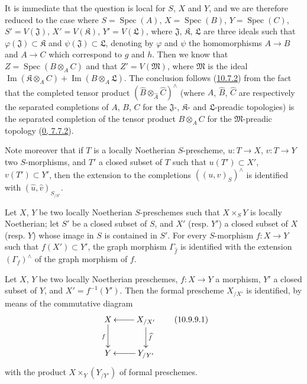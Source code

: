 It is immediate that the question is local for $S$, $X$ and $Y$, and we
are therefore reduced to the case where $S=\operatorname{Spec}(A)$,
$X=\operatorname{Spec}(B)$, $Y=\operatorname{Spec}(C)$,
$S'=V(\mathfrak{J})$, $X'=V(\mathfrak{K})$, $Y'=V(\mathfrak{L})$, where
$\mathfrak{J}$, $\mathfrak{K}$, $\mathfrak{L}$ are three ideals such
that $\varphi(\mathfrak{J})\subset\mathfrak{K}$ and
$\psi(\mathfrak{J})\subset\mathfrak{L}$, denoting by $\varphi$ and
$\psi$ the homomorphisms $A\to B$ and $A\to C$ which correspond to $g$
and $h$. Then we know that $Z=\operatorname{Spec}(B\otimes_A C)$ and that
$Z'=V(\mathfrak{M})$, where $\mathfrak{M}$ is the ideal
$\operatorname{Im}(\mathfrak{K}\otimes_A C)
+\operatorname{Im}(B\otimes_A\mathfrak{L})$. The conclusion follows
(\hyperref[I.10.7.2]{10.7.2}) from the fact that the completed tensor
product $(\widehat B\otimes_{\widehat A}\widehat C)^\wedge$ (where
$\widehat A$, $\widehat B$, $\widehat C$ are respectively the separated
completions of $A$, $B$, $C$ for the $\mathfrak{J}$-, $\mathfrak{K}$-
and $\mathfrak{L}$-preadic topologies) is the separated completion of
the tensor product $B\otimes_A C$ for the $\mathfrak{M}$-preadic
topology (\hyperref[0.7.7.2]{0, 7.7.2}).

Note moreover that if $T$ is a locally Noetherian $S$-prescheme,
$u:T\to X$, $v:T\to Y$ two $S$-morphisms, and $T'$ a closed subset of
$T$ such that $u(T')\subset X'$, $v(T')\subset Y'$, then the extension
to the completions $((u,v)_S)^\wedge$ is identified with
$(\widehat u,\widehat v)_{S_{/S'}}$.

\begin{corollary}[10.9.8]
\label{I.10.9.8}
Let $X$, $Y$ be two locally Noetherian $S$-preschemes such that
$X\times_S Y$ is locally Noetherian; let $S'$ be a closed subset of
$S$, and $X'$ (resp. $Y'$) a closed subset of $X$ (resp. $Y$) whose
image in $S$ is contained in $S'$. For every $S$-morphism
$f:X\to Y$ such that $f(X')\subset Y'$, the graph morphism
$\Gamma_{\widehat f}$ is identified with the extension
$(\Gamma_f)^\wedge$ of the graph morphism of $f$.
\end{corollary}

\begin{corollary}[10.9.9]
\label{I.10.9.9}
Let $X$, $Y$ be two locally Noetherian preschemes, $f:X\to Y$ a
morphism, $Y'$ a closed subset of $Y$, and $X'=f^{-1}(Y')$. Then the
formal prescheme $X_{/X'}$ is identified, by means of the commutative
diagram
\[ \xymatrix{
    X\ar[d]_f &
    X_{/X'}\ar[l]\ar[d]^{\widehat f}\\
    Y &
    Y_{/Y'}\ar[l]
  }
\tag{10.9.9.1}\label{I.10.9.9.1}
\]
with the product $X\times_Y(Y_{/Y'})$ of formal preschemes.
\end{corollary}

